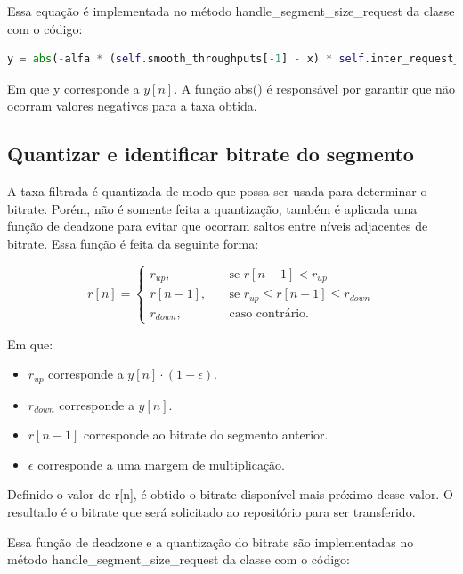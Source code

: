 \documentclass[10pt,twocolumn,letterpaper]{article}
\begin{document}
Essa equação é implementada no método handle\_segment\_size\_request da classe com o código:

\begin{lstlisting}[language=python]
	y = abs(-alfa * (self.smooth_throughputs[-1] - x) * self.inter_request_time[-1] + self.smooth_throughputs[-1])
\end{lstlisting}

Em que y corresponde a $y[n]$. A função abs() é responsável por garantir que não ocorram valores negativos para a taxa obtida.

\subsection{Quantizar e identificar bitrate do segmento}

A taxa filtrada é quantizada de modo que possa ser usada para determinar o bitrate. Porém, não é somente feita a quantização, também é aplicada uma função de deadzone para evitar que ocorram saltos entre níveis adjacentes de bitrate. Essa função é feita da seguinte forma:

\begin{equation}
	r[n] = 
	\begin{cases}
		r_{up},       & \quad \text{se } r[n-1] < r_{up}\\
		r[n-1],       & \quad \text{se } r_{up} \leq r[n-1] \leq r_{down} \\
		r_{down},       & \quad \text{caso contrário.}
	\end{cases}
\end{equation}

Em que:
\begin{itemize}
	\item $r_{up}$ corresponde a $y[n] \cdot (1 - \epsilon)$.
	\item $r_{down}$ corresponde a $y[n]$.
	\item $r[n-1]$ corresponde ao bitrate do segmento anterior.
	\item $\epsilon$ corresponde a uma margem de multiplicação.
\end{itemize}

Definido o valor de r[n], é obtido o bitrate disponível mais próximo desse valor. O resultado é o bitrate que será solicitado ao repositório para ser transferido.

Essa função de deadzone e a quantização do bitrate são implementadas no método handle\_segment\_size\_request da classe com o código:
\end{document}
